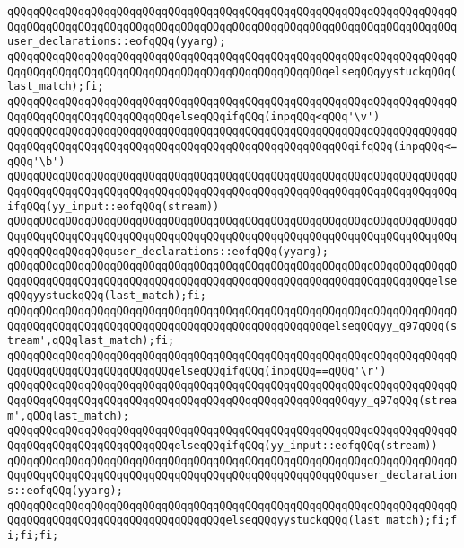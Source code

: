 \verb|qQQqqQQqqQQqqQQqqQQqqQQqqQQqqQQqqQQqqQQqqQQqqQQqqQQqqQQqqQQqqQQqqQQqqQQqqQQqqQQqqQQqqQQqqQQqqQQqqQQqqQQqqQQqqQQqqQQqqQQqqQQqqQQqqQQqqQQqqQQquser_declarations::eofqQQq(yyarg);|\newline
\verb|qQQqqQQqqQQqqQQqqQQqqQQqqQQqqQQqqQQqqQQqqQQqqQQqqQQqqQQqqQQqqQQqqQQqqQQqqQQqqQQqqQQqqQQqqQQqqQQqqQQqqQQqqQQqqQQqqQQqqQQqelseqQQqyystuckqQQq(last_match);fi;|\newline
\verb|qQQqqQQqqQQqqQQqqQQqqQQqqQQqqQQqqQQqqQQqqQQqqQQqqQQqqQQqqQQqqQQqqQQqqQQqqQQqqQQqqQQqqQQqqQQqqQQqelseqQQqifqQQq(inpqQQq<qQQq'\v')|\newline
\verb|qQQqqQQqqQQqqQQqqQQqqQQqqQQqqQQqqQQqqQQqqQQqqQQqqQQqqQQqqQQqqQQqqQQqqQQqqQQqqQQqqQQqqQQqqQQqqQQqqQQqqQQqqQQqqQQqqQQqqQQqqQQqifqQQq(inpqQQq<=qQQq'\b')|\newline
\verb|qQQqqQQqqQQqqQQqqQQqqQQqqQQqqQQqqQQqqQQqqQQqqQQqqQQqqQQqqQQqqQQqqQQqqQQqqQQqqQQqqQQqqQQqqQQqqQQqqQQqqQQqqQQqqQQqqQQqqQQqqQQqqQQqqQQqqQQqqQQqifqQQq(yy_input::eofqQQq(stream))|\newline
\verb|qQQqqQQqqQQqqQQqqQQqqQQqqQQqqQQqqQQqqQQqqQQqqQQqqQQqqQQqqQQqqQQqqQQqqQQqqQQqqQQqqQQqqQQqqQQqqQQqqQQqqQQqqQQqqQQqqQQqqQQqqQQqqQQqqQQqqQQqqQQqqQQqqQQqqQQqqQQquser_declarations::eofqQQq(yyarg);|\newline
\verb|qQQqqQQqqQQqqQQqqQQqqQQqqQQqqQQqqQQqqQQqqQQqqQQqqQQqqQQqqQQqqQQqqQQqqQQqqQQqqQQqqQQqqQQqqQQqqQQqqQQqqQQqqQQqqQQqqQQqqQQqqQQqqQQqqQQqqQQqelseqQQqyystuckqQQq(last_match);fi;|\newline
\verb|qQQqqQQqqQQqqQQqqQQqqQQqqQQqqQQqqQQqqQQqqQQqqQQqqQQqqQQqqQQqqQQqqQQqqQQqqQQqqQQqqQQqqQQqqQQqqQQqqQQqqQQqqQQqqQQqqQQqqQQqelseqQQqyy_q97qQQq(stream',qQQqlast_match);fi;|\newline
\verb|qQQqqQQqqQQqqQQqqQQqqQQqqQQqqQQqqQQqqQQqqQQqqQQqqQQqqQQqqQQqqQQqqQQqqQQqqQQqqQQqqQQqqQQqqQQqqQQqelseqQQqifqQQq(inpqQQq==qQQq'\r')|\newline
\verb|qQQqqQQqqQQqqQQqqQQqqQQqqQQqqQQqqQQqqQQqqQQqqQQqqQQqqQQqqQQqqQQqqQQqqQQqqQQqqQQqqQQqqQQqqQQqqQQqqQQqqQQqqQQqqQQqqQQqqQQqqQQqyy_q97qQQq(stream',qQQqlast_match);|\newline
\verb|qQQqqQQqqQQqqQQqqQQqqQQqqQQqqQQqqQQqqQQqqQQqqQQqqQQqqQQqqQQqqQQqqQQqqQQqqQQqqQQqqQQqqQQqqQQqqQQqelseqQQqifqQQq(yy_input::eofqQQq(stream))|\newline
\verb|qQQqqQQqqQQqqQQqqQQqqQQqqQQqqQQqqQQqqQQqqQQqqQQqqQQqqQQqqQQqqQQqqQQqqQQqqQQqqQQqqQQqqQQqqQQqqQQqqQQqqQQqqQQqqQQqqQQqqQQqqQQquser_declarations::eofqQQq(yyarg);|\newline
\verb|qQQqqQQqqQQqqQQqqQQqqQQqqQQqqQQqqQQqqQQqqQQqqQQqqQQqqQQqqQQqqQQqqQQqqQQqqQQqqQQqqQQqqQQqqQQqqQQqqQQqqQQqelseqQQqyystuckqQQq(last_match);fi;fi;fi;fi;|\newline

